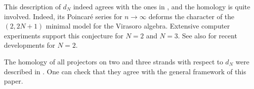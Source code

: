 \documentclass[12pt]{amsart}
\numberwithin{equation}{section}
\newtheorem{theorem}{Theorem}[section]
\newtheorem{corollary}[theorem]{Corollary}
\theoremstyle{definition}
\theoremstyle{remark}
\newcommand{\CA}{\mathcal{A}}
\renewcommand{\1}{\mathbf{1}}
\begin{document}
This description of $d_N$ indeed agrees with the ones in \cite{GL,GOR,GORS}, and the homology is quite involved. Indeed, its Poincar\'e series for $n\to\infty$ deforms the character of the $(2,2N+1)$ minimal model for the Virasoro algebra.  Extensive computer experiments \cite{GL,GOR} support this conjecture for $N=2$ and $N=3$. See also \cite{Hog2} for recent developments for $N=2$.

The homology of all projectors on two and three strands with respect to $d_N$ were described in \cite{GL}. One can check that they agree with the general framework of this paper.


 






%

\end{document}
